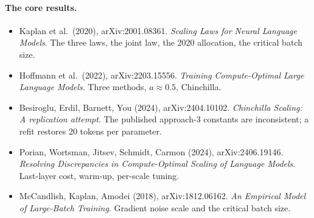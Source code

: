 \documentclass[11pt,letterpaper]{article}
\newcommand{\paper}[1]{\textit{#1}}
\begin{document}
\paragraph{The core results.}
\begin{itemize}
\item Kaplan et al.\ (2020), arXiv:2001.08361. \paper{Scaling Laws for Neural Language Models}. The three laws, the joint law, the 2020 allocation, the critical batch size.
\item Hoffmann et al.\ (2022), arXiv:2203.15556. \paper{Training Compute-Optimal Large Language Models}. Three methods, $a\approx0.5$, Chinchilla.
\item Besiroglu, Erdil, Barnett, You (2024), arXiv:2404.10102. \paper{Chinchilla Scaling: A replication attempt}. The published approach-3 constants are inconsistent; a refit restores 20 tokens per parameter.
\item Porian, Wortsman, Jitsev, Schmidt, Carmon (2024), arXiv:2406.19146. \paper{Resolving Discrepancies in Compute-Optimal Scaling of Language Models}. Last-layer cost, warm-up, per-scale tuning.
\item McCandlish, Kaplan, Amodei (2018), arXiv:1812.06162. \paper{An Empirical Model of Large-Batch Training}. Gradient noise scale and the critical batch size.
\end{itemize}
\end{document}
